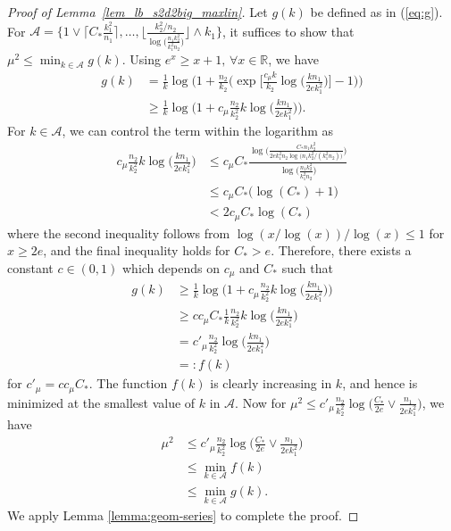 \documentclass{article}
\newcommand{\R}{\mathbb{R}}
\newcommand{\cA}{\mathcal{A}}
\newcommand{\Ct}{C_{*}}
\begin{document}
\begin{proof}[Proof of Lemma~\ref{lem_lb_s2d2big_maxlin}]
    Let $g(k)$ be defined as in (\ref{eq:g}). For $\cA = \{1 \vee \lceil \Ct \frac{k_1^2}{n_1}\rceil, \dots ,  \Big\lfloor \frac{k_2^2/n_2}{\log\big(\frac{n_1k_2^2}{k_1^2n_2}\big)}\Big\rfloor\wedge k_1\}$, it suffices to show that $\mu^2 \leq \min_{k\in\cA}g(k)$. Using $e^x \geq x + 1,\, \forall x \in \R$, we have 
    \begin{align*}
        g(k) &= \frac{1}{k}\log\Bigg(1 + \frac{n_2}{k_2}\bigg(\exp\Big[\frac{c_\mu k}{k_2}\log\big(\frac{kn_1}{2ek_1^2}\big)\Big] - 1\bigg)\Bigg) \\
        &\geq \frac{1}{k}\log\Bigg(1 + c_\mu\frac{n_2}{k^2_2}k\log\Big(\frac{kn_1}{2ek_1^2}\Big)\Bigg).
    \end{align*}
    For $k \in \cA$,  we can control the term within the logarithm as
    \begin{align*}
        c_\mu\frac{n_2}{k^2_2}k\log\Big(\frac{kn_1}{2ek_1^2}\Big) 
        &\leq c_\mu \Ct \frac{\log\Big(\frac{\Ct n_1k_2^2}{2ek_1^2n_2\log\big(n_1k_2^2/(k_1^2n_2)\big)} \Big)}{\log\big(\frac{n_1k_2^2}{k_1^2n_2}\big)} \\
        &\leq c_\mu\Ct \big(\log (\Ct) + 1 \big) \\
        &< 2c_\mu\Ct \log (\Ct)
    \end{align*}
    where the second inequality follows from $\log(x/\log(x))/\log(x) \leq 1$ for $x \geq 2e$, and the final inequality holds for $\Ct > e$. Therefore, there exists a constant $c \in (0,1)$ which depends on $c_\mu$ and $\Ct$ such that 
    \begin{align*}
        g(k) &\geq \frac{1}{k}\log\Bigg(1 + c_\mu\frac{n_2}{k^2_2}k\log\Big(\frac{kn_1}{2ek_1^2}\Big)\Bigg) \\
        &\geq cc_\mu \Ct \frac1k\frac{n_2}{k_2^2}k\log\big(\frac{kn_1}{2ek_1^2}\big) \\
        &= c'_\mu\frac{n_2}{k_2^2}\log\big(\frac{kn_1}{2ek_1^2}\big) \\
        &=: f(k)
    \end{align*}
    for $c'_\mu = c c_\mu \Ct$. The function $f(k)$ is clearly increasing in $k$, and hence is minimized at the smallest value of $k$ in $\cA$. 
    Now for $\mu^2 \leq c'_\mu \frac{n_2}{k_2^2}\log\big(\frac{\Ct}{2e}\vee \frac{n_1}{2ek^2_1}\big)$, we have
    \begin{align*}
        \mu^2 &\leq c'_\mu \frac{n_2}{k_2^2}\log\big(\frac{\Ct}{2e}\vee \frac{n_1}{2ek^2_1}\big) \\
        &\leq \min_{k \in \cA}f(k) \\
        &\leq \min_{k \in \cA}g(k).
    \end{align*}
    We apply Lemma \ref{lemma:geom-series} to complete the proof.
\end{proof}
\end{document}
